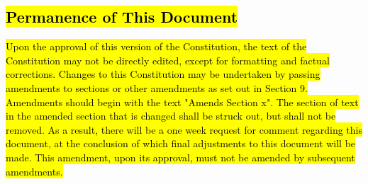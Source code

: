 \documentclass[12pt, a4paper]{article}
\begin{document}
\subsection{\hl{Permanence of This Document}}
\hl{Upon the approval of this version of the Constitution, the text of the Constitution may not be directly edited, except for formatting and factual corrections. 
Changes to this Constitution may be undertaken by passing amendments to sections or other amendments as set out in Section 9. 
Amendments should begin with the text "Amends Section x". The section of text in the amended section that is changed shall be struck out, but shall not be removed.
As a result, there will be a one week request for comment regarding this document, at the conclusion of which final adjustments to this document will be made.
This amendment, upon its approval, must not be amended by subsequent amendments.}
\end{document}
